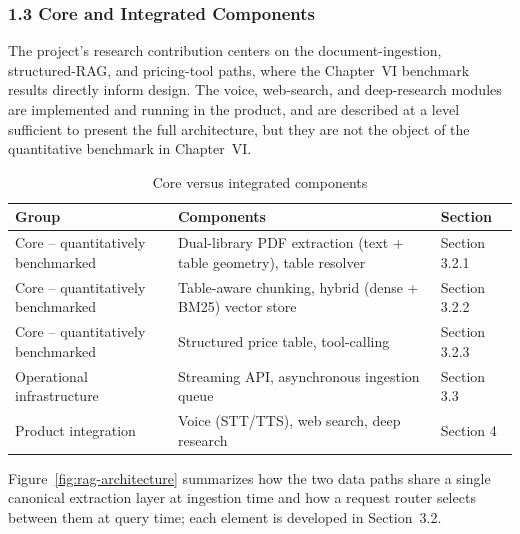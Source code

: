 \documentclass[11pt,a4paper]{article}
\begin{document}
\subsubsection{1.3 Core and Integrated Components}

The project's research contribution centers on the document-ingestion,
structured-RAG, and pricing-tool paths, where the Chapter~VI benchmark
results directly inform design. The voice, web-search, and deep-research
modules are implemented and running in the product, and are described at a
level sufficient to present the full architecture, but they are not the
object of the quantitative benchmark in Chapter~VI.

\begin{table}[htbp]
\centering
\caption{Core versus integrated components}
\label{tab:core-vs-integrated}
\small
\renewcommand{\arraystretch}{1.3}
\begin{tabularx}{\textwidth}{|p{}|X|p{}|}
\hline
\rowcolor{tableheader}
\textbf{Group} & \textbf{Components} & \textbf{Section} \\
\hline
Core -- quantitatively benchmarked &
Dual-library PDF extraction (text + table geometry), table resolver &
Section 3.2.1 \\
\hline
Core -- quantitatively benchmarked &
Table-aware chunking, hybrid (dense + BM25) vector store &
Section 3.2.2 \\
\hline
Core -- quantitatively benchmarked &
Structured price table, tool-calling &
Section 3.2.3 \\
\hline
Operational infrastructure &
Streaming API, asynchronous ingestion queue &
Section 3.3 \\
\hline
Product integration &
Voice (STT/TTS), web search, deep research &
Section 4 \\
\hline
\end{tabularx}
\end{table}
\FloatBarrier

Figure~\ref{fig:rag-architecture} summarizes how the two data paths share a
single canonical extraction layer at ingestion time and how a request router
selects between them at query time; each element is developed in
Section~3.2.
\end{document}
